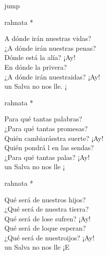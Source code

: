 \begin{cancion}jump\\
	\begin{chorus}%
		rahnata * \jump\\
	\end{chorus}%
	A dónde irán nuestras vidas?\\
	\jump
¿A dónde irán nuestras penas?\\
	Dónde está la alía? ¡Ay!\\
	En dónde la privera?\\
	¿A dónde irán nuestraidas? ¡Ay!\\
	 un Salva no nos lle. ¡ \jump\\
	\begin{chorus}%
		rahnata * \jump\\
	\end{chorus}%
	Para qué tantas palabras?\\
	\jump
¿Para qué tantas promesas?\\
	Quién cambiaráestra suerte? ¡Ay!\\
	Quién pondrá l en las sendas?\\
	¿Para qué tantas palas? ¡Ay!\\
	 un Salva no nos lle ¡ \jump\\
	\begin{chorus}%
		rahnata * \jump\\
	\end{chorus}%
	Qué será de nuestros hijos?\\
	\jump
¿Qué será de nuestra tierra?\\
	Qué será de lose sufren? ¡Ay!\\
	Qué será de loque esperan?\\
	¿Qué será de nuestroijos? ¡Ay!\\
	 un Salva no nos lle ¡E \jump\\
	\begin{chorus}%

\end{chorus}
\end{cancion}
